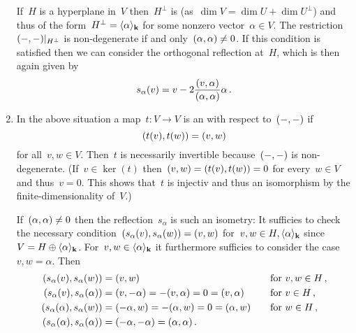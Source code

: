 \begin{recall}
\begin{enumerate}
      If~$H$ is a hyperplane in~$V$ then~$H^{\perp}$ is {\onedimensional} (as~$\dim V = \dim U + \dim U^\perp$) and thus of the form~$H^{\perp} = \langle\alpha\rangle_{\mathbf{k}}$ for some nonzero vector~$\alpha \in V$.
      The restriction~$\restrict{\inner{-,-}}{H^\perp}$ is non-degenerate if and only~$(\alpha, \alpha) \neq 0$.
      If this condition is satisfied then we can consider the orthogonal reflection at~$H$, which is then again given by
      \[
        s_\alpha(v)
        =
        v - 2 \frac{(v,\alpha)}{(\alpha,\alpha)} \alpha \,.
      \]
    \item
      In the above situation a map~$t \colon V \to V$ is an  with respect to~$(-,-)$ if
      \[
        (t(v), t(w))
        =
        (v,w)
      \]
      for all~$v, w \in V$.
      Then~$t$ is necessarily invertible because~$(-,-)$ is non-degenerate.
      (If~$v \in \ker(t)$ then~$(v,w) = (t(v),t(w)) = 0$ for every~$w \in V$ and thus~$v = 0$.
      This shows that~$t$ is injectiv and thus an isomorphism by the finite-dimensionality of~$V$.)
      
      If~$(\alpha, \alpha) \neq 0$ then the reflection~$s_\alpha$ is such an isometry:
      It sufficies to check the necessary condition~$(s_\alpha(v), s_\alpha(w)) = (v,w)$ for~$v, w \in H, \langle\alpha\rangle_{\mathbf{k}}$ since~$V = H \oplus \langle\alpha\rangle_{\mathbf{k}}$.
      For~$v, w \in \langle\alpha\rangle_{\mathbf{k}}$ it furthermore sufficies to consider the case~$v, w = \alpha$.
      Then
      \begin{alignat*}{2}
        (s_\alpha(v), s_\alpha(w))
        &=
        (v, w)
        &
        \quad
        &\text{for~$v, w \in H$} \,,
        \\
        (s_\alpha(v), s_\alpha(\alpha))
        &=
        (v, -\alpha)
        =
        -(v,\alpha)
        =
        0
        =
        (v, \alpha)
        &
        \quad
        &\text{for~$v \in H$} \,,
        \\
        (s_\alpha(\alpha), s_\alpha(w))
        &=
        (-\alpha, w)
        =
        -(\alpha, w)
        =
        0
        =
        (\alpha, w)
        &
        \quad
        &\text{for~$w \in H$} \,,
        \\
        (s_\alpha(\alpha), s_\alpha(\alpha))
        &=
        (-\alpha, -\alpha)
        =
        (\alpha,\alpha) \,.
        &
        {}
        &
        {}
      \end{alignat*}
      

\end{enumerate}
\end{recall}
